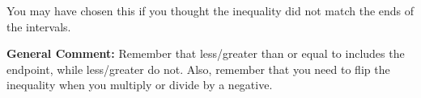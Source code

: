 \documentclass{extbook}[14pt]
\begin{document}
\begin{enumerate}
{\begin{enumerate}[label=\Alph*.]
You may have chosen this if you thought the inequality did not match the ends of the intervals.
\end{enumerate}

\textbf{General Comment:} Remember that less/greater than or equal to includes the endpoint, while less/greater do not. Also, remember that you need to flip the inequality when you multiply or divide by a negative.
}
\end{enumerate}
\end{document}
